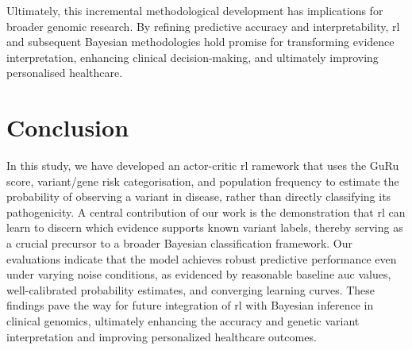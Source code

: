 Ultimately, this incremental methodological development has implications for broader genomic research. By refining predictive accuracy and interpretability, \ac{rl} and subsequent Bayesian methodologies hold promise for transforming evidence interpretation, enhancing clinical decision-making, and ultimately improving personalised healthcare.

\section{Conclusion}
In this study, we have developed an actor-critic \ac{rl} ramework that uses the GuRu score, variant/gene risk categorisation, and population frequency to estimate the probability of observing a variant in disease, rather than directly classifying its pathogenicity. A central contribution of our work is the demonstration that \ac{rl} can learn to discern which evidence supports known variant labels, thereby serving as a crucial precursor to a broader Bayesian classification framework. Our evaluations indicate that the model achieves robust predictive performance even under varying noise conditions, as evidenced by reasonable baseline \ac{auc} values, well-calibrated probability estimates, and converging learning curves. These findings pave the way for future integration of \ac{rl} with Bayesian inference in clinical genomics, ultimately enhancing the accuracy and genetic variant interpretation and improving personalized healthcare outcomes.


  



